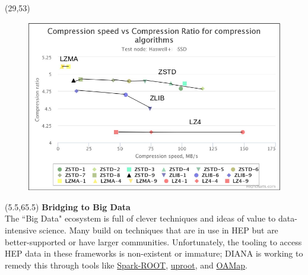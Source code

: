 \documentclass[final]{beamer}
\begin{document}
\begin{frame}{}
\begin{textblock}{12.5}(29,53)
\begin{figure}[tbph]
\centering
\includegraphics[width=\textwidth]{images/compr.png}
\end{figure}
\end{textblock}


\begin{textblock}{22.5}(5.5,65.5)
\textcolor{mybluelabel}{\bf Bridging to Big Data} \\
The ``Big Data" ecosystem is full of clever techniques and ideas of value to data-intensive science.
Many build on techniques that are in use in HEP but are better-supported or have larger communities.
Unfortunately, the tooling to access HEP data in these frameworks is non-existent or immature;
DIANA is working to remedy this through tools like \href{https://github.com/diana-hep/spark-root}{Spark-ROOT}, \href{https://github.com/scikit-hep/uproot}{uproot}, and \href{https://github.com/diana-hep/oamap}{OAMap}.
\end{textblock}


\end{frame}
\end{document}
